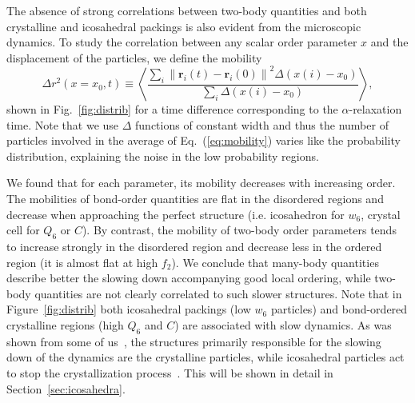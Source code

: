 \documentclass[twocolumn,superscriptaddress]{revtex4}
\begin{document}
The absence of strong correlations between two-body quantities and both crystalline and icosahedral packings is also evident from
the microscopic dynamics.
To study the correlation between any scalar order parameter $x$ and the displacement of the particles, we define the mobility 
\begin{equation}
	\Delta r^2(x=x_0, t) \equiv \left\langle \frac{
		\sum\limits_i{
			\left\|\mathbf{r}_i(t)-\mathbf{r}_i(0)\right\|^2 \Delta(x(i)-x_0)
			}
	}{
		\sum\limits_i{\Delta(x(i)-x_0)}
	}\right\rangle,
	\label{eq:mobility}
\end{equation}
shown in Fig.~\ref{fig:distrib} for a time difference corresponding to the $\alpha$-relaxation time. Note that we use $\Delta$ functions of constant width and thus the number of particles involved in the average of Eq.~(\ref{eq:mobility}) varies like the probability distribution, explaining the noise in the low probability regions.

We found that for each parameter, its mobility decreases with increasing order. The mobilities of bond-order quantities are flat in the disordered regions and decrease when approaching the perfect structure (i.e. icosahedron for $w_6$, crystal cell for $Q_6$ or $C$). By contrast, the mobility of two-body order parameters tends to increase strongly in the disordered region and decrease less in the ordered region (it is almost flat at high $f_2$). We conclude that many-body quantities describe better the slowing down accompanying good local ordering, while two-body quantities are not clearly correlated to such slower structures.
Note that in Figure~\ref{fig:distrib} both icosahedral packings (low $w_6$ particles) and bond-ordered crystalline regions (high $Q_6$ and $C$) are associated with slow dynamics. As was shown from some of us~\cite{mathieu_icosahedra}, the structures primarily responsible for the slowing down of the dynamics are the crystalline particles, while icosahedral particles act to stop the crystallization process~\cite{russo_hs}.
This will be shown in detail in Section~\ref{sec:icosahedra}.
\end{document}
